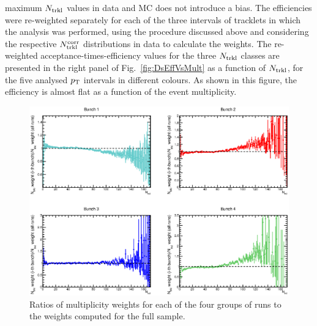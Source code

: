 maximum $N_{\rm trkl}$ values in data and MC does not introduce a bias.
The efficiencies were re-weighted separately for each of the three intervals of tracklets
in which the analysis was performed, using the procedure discussed above and considering
the respective $N_{\rm trkl}^{\rm corr}$ distributions in data to calculate the weights.
The re-weighted acceptance-times-efficiency values for the three $N_{\rm trkl}$ classes are presented in 
the right panel of Fig.~\ref{fig:DsEffVsMult} as a function of $N_{\rm trkl}$, for the five analysed $p_{\rm T}$ intervals
in different colours. As shown in this figure, the efficiency is almost flat 
as a function of the event multiplicity.\\



\begin{figure}[!h]
\centering
 \includegraphics[width=.9\textwidth]{FigCap6/NtrkDistrMC_17d2a_EvWithD_zVxtUnCorr_896_897.eps}
 \caption{Ratios of multiplicity weights for each of the four groups of runs to the weights computed for the full sample.}
 \label{fig:RatioNtrklMC}
\end{figure}

